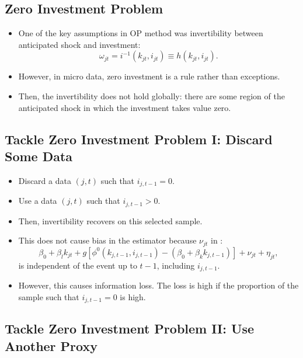 \documentclass[
]{book}
\providecommand{\tightlist}{%
  \setlength{\itemsep}{0pt}\setlength{\parskip}{0pt}}
\begin{document}
\hypertarget{zero-investment-problem}{%
\subsection{Zero Investment Problem}\label{zero-investment-problem}}

\begin{itemize}
\tightlist
\item
  One of the key assumptions in OP method was invertibility between anticipated shock and investment:
  \begin{equation}
  \omega_{jt} = i^{-1}(k_{jt}, i_{jt}) \equiv h(k_{jt}, i_{jt}).
  \end{equation}
\item
  However, in micro data, zero investment is a rule rather than exceptions.
\item
  Then, the invertibility does not hold globally: there are some region of the anticipated shock in which the investment takes value zero.
\end{itemize}

\hypertarget{tackle-zero-investment-problem-i-discard-some-data}{%
\subsection{Tackle Zero Investment Problem I: Discard Some Data}\label{tackle-zero-investment-problem-i-discard-some-data}}

\begin{itemize}
\tightlist
\item
  Discard a data \((j, t)\) such that \(i_{j, t - 1} = 0\).
\item
  Use a data \((j, t)\) such that \(i_{j, t - 1} > 0\).
\item
  Then, invertibility recovers on this selected sample.
\item
  This does not cause bias in the estimator because \(\nu_{jt}\) in :
  \begin{equation}
  \beta_0 + \beta_l k_{jt} + g[\phi^0(k_{j, t - 1}, i_{j, t - 1}) - (\beta_0 + \beta_k k_{j, t - 1})] + \nu_{jt} + \eta_{jt},
  \end{equation}
  is independent of the event up to \(t - 1\), including \(i_{j, t - 1}\).
\item
  However, this causes information loss. The loss is high if the proportion of the sample such that \(i_{j, t - 1} = 0\) is high.
\end{itemize}

\hypertarget{tackle-zero-investment-problem-ii-use-another-proxy}{%
\subsection{Tackle Zero Investment Problem II: Use Another Proxy}\label{tackle-zero-investment-problem-ii-use-another-proxy}}
\end{document}

